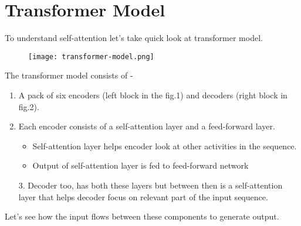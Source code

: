 \documentclass[11pt]{article}
\begin{document}
\section{Transformer Model}

To understand self-attention let's take quick look at transformer model\cite{jAlammar1}.

\begin{figure}[!h]
	\begin{center}
  \texttt{[image: transformer-model.png]}
  \label{fig:transformer-model}
  	\end{center}
\end{figure}

The transformer model consists of - 
	\begin{enumerate}
		\item A pack of six encoders (left block in the fig.1) and decoders (right block in fig.2).
		\item Each encoder consists of a self-attention layer and a feed-forward layer.
		\begin{itemize}
				\item Self-attention layer helps encoder look at other activities in the sequence.
				\item Output of self-attention layer is fed to feed-forward network
		\end{itemize}

3.	Decoder too, has both these layers but between then is a self-attention layer that helps decoder focus on relevant part of the input sequence.

	\end{enumerate}

Let’s see how the input flows between these components to generate output.
\end{document}
